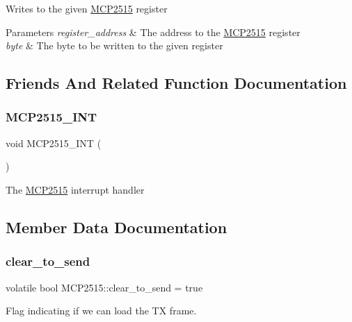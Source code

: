 Writes to the given \hyperlink{class_m_c_p2515}{M\+C\+P2515} register 
\begin{DoxyParams}{Parameters}
{\em register\+\_\+address} & The address to the \hyperlink{class_m_c_p2515}{M\+C\+P2515} register \\
\hline
{\em byte} & The byte to be written to the given register \\
\hline
\end{DoxyParams}


\subsection{Friends And Related Function Documentation}
\hypertarget{class_m_c_p2515_a3e97befdad3bb95f1da9cf6ff507febe}{}\label{class_m_c_p2515_a3e97befdad3bb95f1da9cf6ff507febe} 
\subsubsection{\texorpdfstring{M\+C\+P2515\+\_\+\+I\+NT}{MCP2515\_INT}}
{\footnotesize\ttfamily void M\+C\+P2515\+\_\+\+I\+NT (\begin{DoxyParamCaption}{ }\end{DoxyParamCaption})\hspace{0.3cm}{\ttfamily [friend]}}

The \hyperlink{class_m_c_p2515}{M\+C\+P2515} interrupt handler 

\subsection{Member Data Documentation}
\hypertarget{class_m_c_p2515_a1418f0f66d9a57659809192552d5ac37}{}\label{class_m_c_p2515_a1418f0f66d9a57659809192552d5ac37} 
\subsubsection{\texorpdfstring{clear\+\_\+to\+\_\+send}{clear\_to\_send}}
{\footnotesize\ttfamily volatile bool M\+C\+P2515\+::clear\+\_\+to\+\_\+send = true\hspace{0.3cm}{\ttfamily [private]}}

Flag indicating if we can load the TX frame. \hypertarget{class_m_c_p2515_a7c70cb397f4d2881a1878e40b9278ad0}{}\label{class_m_c_p2515_a7c70cb397f4d2881a1878e40b9278ad0} 
